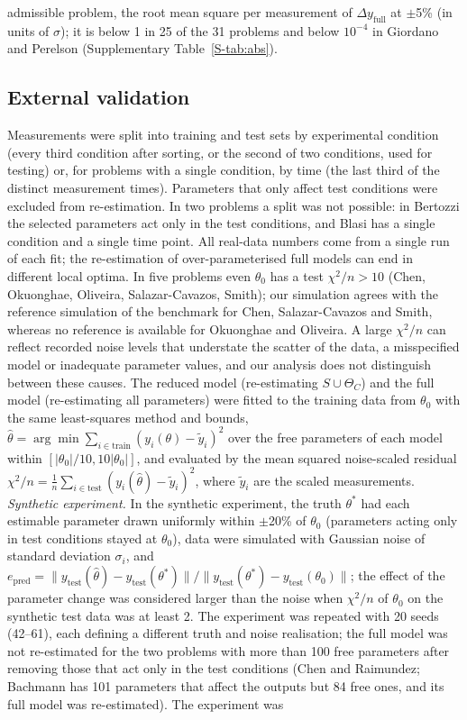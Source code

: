 \documentclass[pdflatex,sn-nature]{sn-jnl}
\theoremstyle{plain}
\begin{document}
admissible problem, the root mean square per measurement of $\Delta y_{\mathrm{full}}$ at $\pm$5\% (in units of $\sigma$); it is below 1 in 25 of the 31 problems and below $10^{-4}$ in Giordano and Perelson (Supplementary Table~\ref{S-tab:abs}).

\subsection*{External validation}\label{met:validation}

Measurements were split into training and test sets by experimental condition (every third condition after sorting, or the second of two conditions, used for testing) or, for problems with a single condition, by time (the last third of the distinct measurement times). Parameters that only affect test conditions were excluded from re-estimation. In two problems a split was not possible: in Bertozzi the selected parameters act only in the test conditions, and Blasi has a single condition and a single time point. All real-data numbers come from a single run of each fit; the re-estimation of over-parameterised full models can end in different local optima\cite{bib52}. In five problems even $\theta_0$ has a test $\chi^2/n>10$ (Chen, Okuonghae, Oliveira, Salazar-Cavazos, Smith); our simulation agrees with the reference simulation of the benchmark for Chen, Salazar-Cavazos and Smith, whereas no reference is available for Okuonghae and Oliveira. A large $\chi^2/n$ can reflect recorded noise levels that understate the scatter of the data, a misspecified model or inadequate parameter values, and our analysis does not distinguish between these causes. The reduced model (re-estimating $S\cup\Theta_C$) and the full model (re-estimating all parameters) were fitted to the training data from $\theta_0$ with the same least-squares method and bounds, $\hat\theta=\arg\min\sum_{i\in\mathrm{train}}(y_i(\theta)-\tilde y_i)^2$ over the free parameters of each model within $[|\theta_0|/10,10|\theta_0|]$, and evaluated by the mean squared noise-scaled residual $\chi^2/n=\frac{1}{n}\sum_{i\in\mathrm{test}}(y_i(\hat\theta)-\tilde y_i)^2$, where $\tilde y_i$ are the scaled measurements. \label{met:val-synth}\emph{Synthetic experiment.} In the synthetic experiment, the truth $\theta^\ast$ had each estimable parameter drawn uniformly within $\pm$20\% of $\theta_0$ (parameters acting only in test conditions stayed at $\theta_0$), data were simulated with Gaussian noise of standard deviation $\sigma_i$, and $e_{\mathrm{pred}}=\|y_{\mathrm{test}}(\hat\theta)-y_{\mathrm{test}}(\theta^\ast)\|/\|y_{\mathrm{test}}(\theta^\ast)-y_{\mathrm{test}}(\theta_0)\|$; the effect of the parameter change was considered larger than the noise when $\chi^2/n$ of $\theta_0$ on the synthetic test data was at least 2. The experiment was repeated with 20 seeds (42--61), each defining a different truth and noise realisation; the full model was not re-estimated for the two problems with more than 100 free parameters after removing those that act only in the test conditions (Chen and Raimundez; Bachmann has 101 parameters that affect the outputs but 84 free ones, and its full model was re-estimated). The experiment was 
\end{document}

